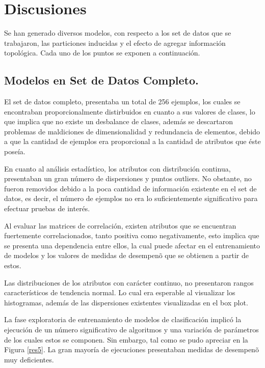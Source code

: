 \chapter{Discusiones}

Se han generado diversos modelos, con respecto a los set de datos que se trabajaron, las particiones inducidas y el efecto de agregar informaci\'on topol\'ogica. Cada uno de los puntos se exponen a continuaci\'on.

\section{Modelos en Set de Datos Completo.}

El set de datos completo, presentaba un total de 256 ejemplos, los cuales se encontraban proporcionalmente distirbuidos en cuanto a sus valores de clases, lo que implica que no existe un desbalance de clases, adem\'as se descartaron problemas de maldiciones de dimensionalidad y redundancia de elementos, debido a que la cantidad de ejemplos era proporcional a la cantidad de atributos que \'este pose\'ia.

En cuanto al an\'alisis estad\'istico, los atributos con distribuci\'on continua, presentaban un gran n\'umero de dispersiones y puntos outliers. No obstante, no fueron removidos debido a la poca cantidad de informaci\'on existente en el set de datos, es decir, el n\'umero de ejemplos no era lo suficientemente significativo para efectuar pruebas de inter\'es.

Al evaluar las matrices de correlaci\'on, existen atributos que se encuentran fuertemente correlacionados, tanto positiva como negativamente, esto implica que se presenta una dependencia entre ellos, la cual puede afectar en el entrenamiento de modelos y los valores de medidas de desempen\~o que se obtienen a partir de estos. 

Las distribuciones de los atributos con car\'acter continuo, no presentaron rangos caracter\'isticos de tendencia normal. Lo cual era esperable al visualizar los histogramas, adem\'as de las dispersiones existentes visualizadas en el box plot.

La fase exploratoria de entrenamiento de modelos de clasificaci\'on implic\'o la ejecuci\'on de un n\'umero significativo de algoritmos y una variaci\'on de par\'ametros de los cuales estos se componen. Sin embargo, tal como se pudo apreciar en la Figura \ref{res5}. La gran mayor\'ia de ejecuciones presentaban medidas de desempen\~o muy deficientes. 

